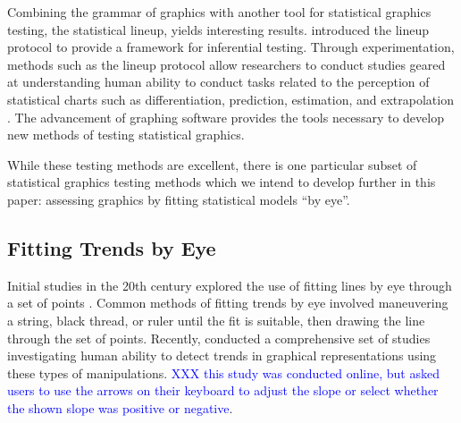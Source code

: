 \documentclass[12pt]{article}
\begin{document}
Combining the grammar of graphics with another tool for statistical
graphics testing, the statistical lineup, yields interesting results.
\citet{buja2009statistical} introduced the lineup protocol to provide a
framework for inferential testing. Through experimentation, methods such
as the lineup protocol allow researchers to conduct studies geared at
understanding human ability to conduct tasks related to the perception
of statistical charts such as differentiation, prediction, estimation,
and extrapolation
\citep{vanderplas2017clusters, vanderplas2015spatial, hofmann2012graphical}.
The advancement of graphing software provides the tools necessary to
develop new methods of testing statistical graphics.

While these testing methods are excellent, there is one particular
subset of statistical graphics testing methods which we intend to
develop further in this paper: assessing graphics by fitting statistical
models ``by eye''.

\hypertarget{fitting-trends-by-eye}{%
\subsection{Fitting Trends by Eye}\label{fitting-trends-by-eye}}

Initial studies in the 20th century explored the use of fitting lines by
eye through a set of points
\citep{finney1951subjective, mosteller1981eye}. Common methods of
fitting trends by eye involved maneuvering a string, black thread, or
ruler until the fit is suitable, then drawing the line through the set
of points. Recently, \citet{ciccione2021can} conducted a comprehensive
set of studies investigating human ability to detect trends in graphical
representations
{\textcolor{RedOrange}{using these types of manipulations.}}
{\textcolor{blue}{XXX this study was conducted online, but asked users to use the arrows on their keyboard to adjust the slope or select whether the shown slope was positive or negative}}.
\end{document}
